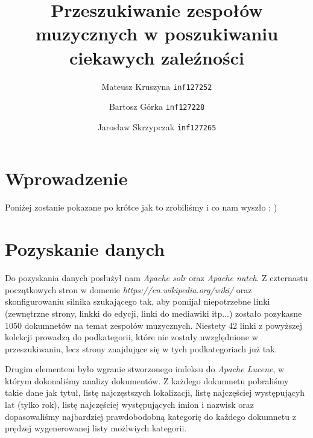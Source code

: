 \documentclass[journal]{IEEEtran}
\begin{document}
\title{Przeszukiwanie zespołów muzycznych w poszukiwaniu ciekawych zaleźności}
\author{
    Mateusz Kruszyna \texttt{inf127252}\\
    \and
    Bartosz Górka \texttt{inf127228}\\
    \and
    Jarosław Skrzypczak \texttt{inf127265}
}
\maketitle
\IEEEpeerreviewmaketitle

\section{Wprowadzenie}
Poniżej zostanie pokazane po krótce jak to zrobiliśmy i co nam wyszło ; )

\section{Pozyskanie danych}
Do pozyskania danych posłużył nam \textit{Apache solr} oraz \textit{Apache nutch}.
Z czternastu początkowych stron w domenie \textit{https://en.wikipedia.org/wiki/}
oraz skonfigurowaniu silnika szukającego tak, aby pomijał niepotrzebne linki
(zewnętrzne strony, linkki do edycji, linki do mediawiki itp...)
zostało pozykasne 1050 dokumnetów na temat zespołów muzycznych.
Niestety 42 linki z powyższej kolekcji prowadzą do podkategorii, które nie zostały
uwzględnione w przeszukiwaniu, lecz strony znajdujące się w tych podkategoriach już tak.

Drugim elementem było wgranie stworzonego indeksu do \textit{Apache Lucene}, w którym
dokonaliśmy analizy dokumentów. Z każdego dokumnetu pobraliśmy takie dane jak tytuł,
listę najczęstszych lokalizacji, listę najczęściej występującyh lat (tylko rok),
listę najczęściej występujących imion i nazwisk oraz
dopasowaliśmy najbardziej prawdobodobną kategorię do każdego dokumnetu
z prędzej wygenerowanej listy możlwiych kategorii.
\end{document}
